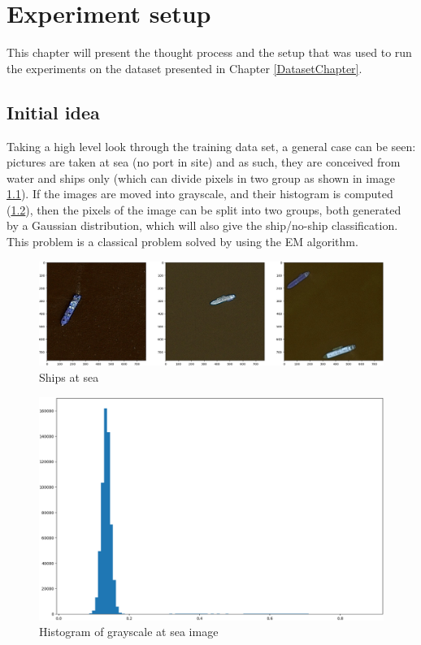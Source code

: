 \chapter{Experiment setup}
\label{ExperimentSetup}

This chapter will present the thought process and the setup that was used to run the experiments on the dataset presented in Chapter \ref{DatasetChapter}.

\section{Initial idea}

Taking a high level look through the training data set, a general case can be seen: pictures are taken at sea (no port in site) and as such, they are conceived from water and ships only (which can divide pixels in two group as shown in image \ref{ShipExampleAtSea}). If the images are moved into grayscale, and their histogram is computed (\ref{ImageHistogram}), then the pixels of the image can be split into two groups, both generated by a Gaussian distribution, which will also give the ship/no-ship classification. This problem is a classical problem solved by using the EM algorithm.

\begin{figure}[h]
	\centering
	\includegraphics[height=0.2\textheight]{Pictures/002ShipExampleatSea.png}
	\caption{Ships at sea}
	\label{ShipExampleAtSea}
\end{figure}

\begin{figure}[h]
	\centering
	\includegraphics[width=\textwidth]{Pictures/005ImageHistogram.png}
	\caption{Histogram of grayscale at sea image}
	\label{ImageHistogram}
\end{figure}

